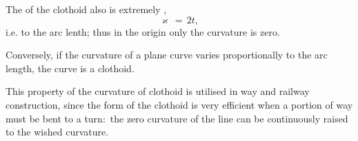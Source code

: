\documentclass[12pt]{article}
\theoremstyle{definition}
\begin{document}
The  of the clothoid also is extremely ,
$$\varkappa \,=\, 2t,$$
i.e.  to the arc lenth; thus in the origin only the curvature is zero.

Conversely, if the curvature of a plane curve varies proportionally to the arc length, the curve is a clothoid.

This property of the curvature of clothoid is utilised in way and railway construction, since the form of the clothoid is very efficient when a  portion of way must be bent to a turn:\, the zero curvature of the line can be continuously raised to the wished curvature.

\end{document}
